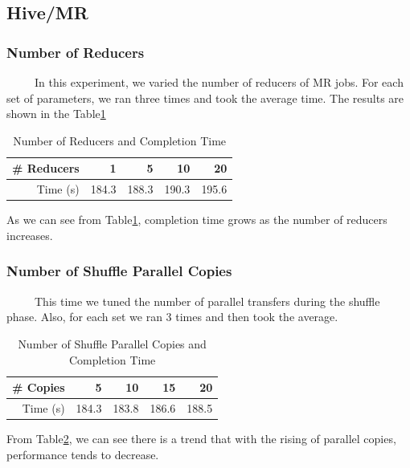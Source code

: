 \documentclass[10pt]{article}
\begin{document}
\subsection{Hive/MR}
\subsubsection{Number of Reducers}
~~~~~In this experiment, we varied the number of reducers of MR jobs. For each set of parameters, we ran three times and took the average time. The results are shown in the Table\ref{tab:num_of_reducers}

\begin{table}[htbp]
  \centering
  \caption{Number of Reducers and Completion Time}
    \begin{tabular}{rrrrr}
    \toprule
    \# Reducers & 1     & 5     & 10    & 20 \\
    \midrule
    Time (s) & 184.3 & 188.3 & 190.3 & 195.6 \\
    \bottomrule
    \end{tabular}%
  \label{tab:num_of_reducers}%
\end{table}%

As we can see from Table\ref{tab:num_of_reducers}, completion time grows as the number of reducers increases.

\subsubsection{Number of Shuffle Parallel Copies}

~~~~~This time we tuned the number of parallel transfers during the shuffle phase. Also, for each set we ran 3 times and then took the average.

\begin{table}[htbp]
  \centering
  \caption{Number of Shuffle Parallel Copies and Completion Time}
    \begin{tabular}{rrrrr}
    \toprule
    \# Copies & 5     & 10    & 15    & 20 \\
    \midrule
    Time (s) & 184.3 & 183.8 & 186.6 & 188.5 \\
    \bottomrule
    \end{tabular}%
  \label{tab:num_of_parallel}%
\end{table}%

From Table\ref{tab:num_of_parallel}, we can see there is a trend that with the rising of parallel copies, performance tends to decrease.
\end{document}
